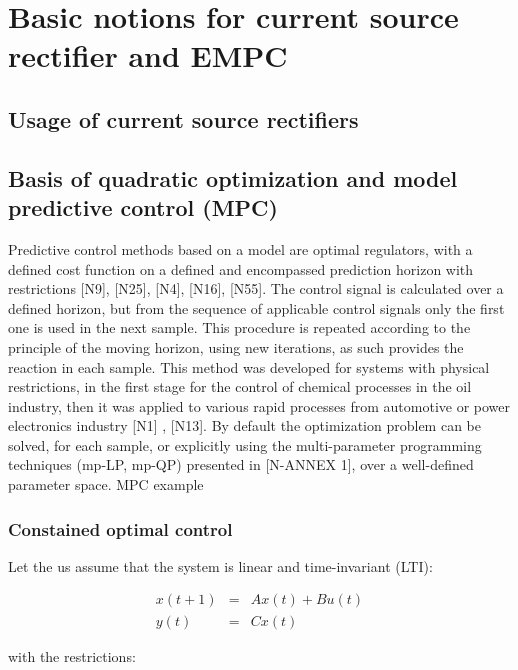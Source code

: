 \section{Basic notions for current source rectifier and EMPC}

	\subsection{Usage of current source rectifiers}

	\subsection{Basis of quadratic optimization and model predictive control (MPC)}
	
	Predictive control methods based on a model are optimal regulators, with a defined cost function on a defined and encompassed  	prediction horizon with restrictions [N9], [N25], [N4], [N16], [N55]. The control signal is calculated over a defined horizon, but from the sequence of applicable control signals only the first one is used in the next sample. This procedure is repeated according to the principle of the moving horizon, using new iterations, as such provides the reaction in each sample. This method was developed for systems with physical restrictions, in the first stage for the control of chemical processes in the oil industry, then it was applied to various rapid processes from automotive or power electronics industry [N1] , [N13]. By default the optimization problem can be solved, for each sample, or explicitly using the multi-parameter programming techniques (mp-LP, mp-QP) presented in [N-ANNEX 1], over a well-defined parameter space.
	MPC example
	
	\subsubsection{Constained optimal control}
	
	Let the us assume that the system is linear and time-invariant (LTI):
	
	    \begin{equation}
        \begin{array}{rcl}
            x(t+1)&=&Ax(t)+Bu(t)\\
						y(t)&=&Cx(t)
        \end{array}
        \label{BASIC:equ:basic_LTI}
    \end{equation}
		
	with the restrictions:
	
